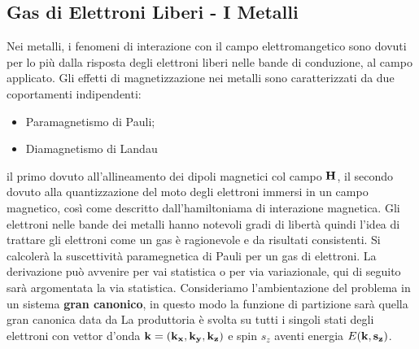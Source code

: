 \documentclass[a4paper,12pt]{article}
\begin{document}
\subsection{Gas di Elettroni Liberi - I Metalli}
Nei metalli, i fenomeni di interazione con il campo elettromangetico sono dovuti per lo più dalla risposta degli elettroni liberi nelle bande di conduzione, al campo applicato. Gli effetti di magnetizzazione nei metalli sono caratterizzati da due coportamenti indipendenti:
\begin{itemize}
	\item Paramagnetismo di Pauli;
	\item Diamagnetismo di Landau
\end{itemize}
il primo dovuto all'allineamento dei dipoli magnetici col campo $\it\bf{H} $, il secondo dovuto alla quantizzazione del moto degli elettroni immersi in un campo magnetico, così come descritto dall'hamiltoniama di interazione magnetica. Gli elettroni nelle bande dei metalli hanno notevoli gradi di libertà quindi l'idea di trattare gli elettroni come un gas è ragionevole e da risultati consistenti. Si calcolerà la suscettività paramegnetica di Pauli per un gas di elettroni. La derivazione può avvenire per vai statistica o per via variazionale, qui di seguito sarà argomentata la via statistica. Consideriamo l'ambientazione del problema in un sistema \textbf{gran canonico}, in questo modo la funzione di partizione sarà quella gran canonica data da
La produttoria è svolta su tutti i singoli stati degli elettroni con vettor d'onda $\it\bf{k} = \left(k_x,k_y,k_z\right)$ e spin $s_z$ aventi energia $E(\it\bf{k} ,s_z)$. 
\end{document}
